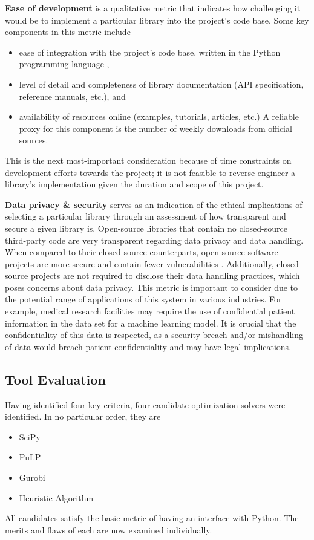 \documentclass[../mthe-493-final-project.tex]{subfiles}
\begin{document}
    \textbf{Ease of development} is a qualitative metric that indicates how challenging it would be to implement a particular library into the project's code base. Some key components in this metric include
    \begin{itemize}
        \item ease of integration with the project's code base, written in the Python programming language \cite{10.5555/1593511},
        \item level of detail and completeness of library documentation (API specification, reference manuals, etc.), and
        \item availability of resources online (examples, tutorials, articles, etc.) A reliable proxy for this component is the number of weekly downloads from official sources.
    \end{itemize}
    This is the next most-important consideration because of time constraints on development efforts towards the project; it is not feasible to reverse-engineer a library's implementation given the duration and scope of this project.
    
    \textbf{Data privacy \& security} serves as an indication of the ethical implications of selecting a particular library through an assessment of how transparent and secure a given library is. Open-source libraries that contain no closed-source third-party code are very transparent regarding data privacy and data handling. When compared to their closed-source counterparts, open-source software projects are more secure and contain fewer vulnerabilities \cite{clarke2009open}. Additionally, closed-source projects are not required to disclose their data handling practices, which poses concerns about data privacy.
    This metric is important to consider due to the potential range of applications of this system in various industries. For example, medical research facilities may require the use of confidential patient information in the data set for a machine learning model. It is crucial that the confidentiality of this data is respected, as a security breach and/or mishandling of data would breach patient confidentiality and may have legal implications.
    
    \subsection{Tool Evaluation}
    \label{ssec:optimization-tool-evaluation}
    
    Having identified four key criteria, four candidate optimization solvers were identified. In no particular order, they are
    \begin{itemize}
        \item SciPy
        \item PuLP
        \item Gurobi
        \item Heuristic Algorithm
    \end{itemize}
    All candidates satisfy the basic metric of having an interface with Python. The merits and flaws of each are now examined individually.
    
\end{document}
